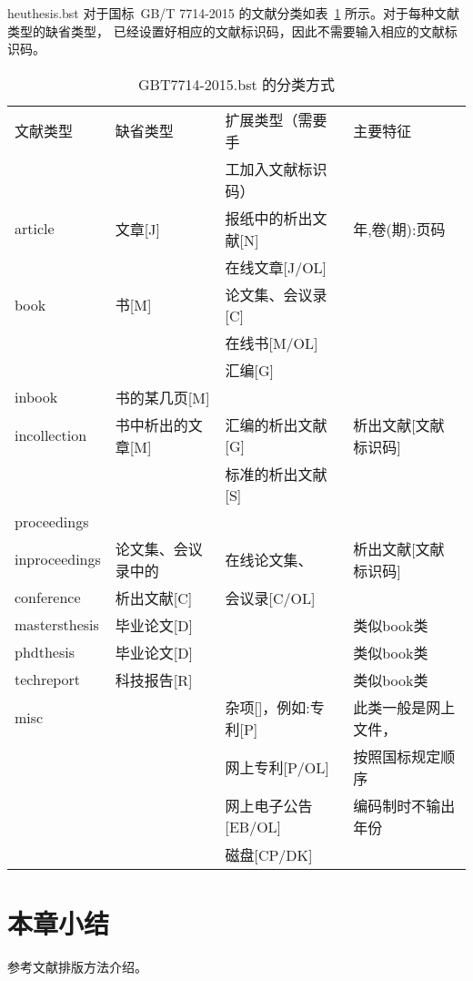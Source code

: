 heuthesis.bst 对于国标~GB/T 7714-2015 的文献分类如表~\ref{tab:entrytypes} 所示。对于每种文献类型的缺省类型，
已经设置好相应的文献标识码，因此不需要输入相应的文献标识码。

\begin{table}[htbp]
  \caption{GBT7714-2015.bst 的分类方式}
  \label{tab:entrytypes}
  \vspace{0.5em}\centering\wuhao
  \begin{tabular}{llll}
    \toprule[1.5pt]
    文献类型      & 缺省类型           & 扩展类型（需要手     & 主要特征             \\
                  &                    & 工加入文献标识码）   &                      \\
    \midrule[1pt]
    article       & 文章[J]            & 报纸中的析出文献[N]  & 年,卷(期):页码       \\
                  &                    & 在线文章[J/OL]       &                      \\
    book          & 书[M]              & 论文集、会议录[C]    &                      \\
                  &                    & 在线书[M/OL]         &                      \\
                  &                    & 汇编[G]              &                      \\
    inbook        & 书的某几页[M]      &                      &                      \\
    incollection  & 书中析出的文章[M]  & 汇编的析出文献[G]    & 析出文献[文献标识码] \\
                  &                    & 标准的析出文献[S]    &                      \\
    proceedings   &                    &                      &                      \\
    inproceedings & 论文集、会议录中的 & 在线论文集、         & 析出文献[文献标识码] \\
    conference    & 析出文献[C]        & 会议录[C/OL]         &                      \\
    mastersthesis & 毕业论文[D]        &                      & 类似book类           \\
    phdthesis     & 毕业论文[D]        &                      & 类似book类           \\
    techreport    & 科技报告[R]        &                      & 类似book类           \\
    misc          &                    & 杂项[]，例如:专利[P] & 此类一般是网上文件， \\
                  &                    & 网上专利[P/OL]       & 按照国标规定顺序     \\
                  &                    & 网上电子公告[EB/OL]  & 编码制时不输出年份   \\
                  &                    & 磁盘[CP/DK]          &                      \\
    \bottomrule[1.5pt]
  \end{tabular}
\end{table}

\section*{本章小结}
参考文献排版方法介绍。
